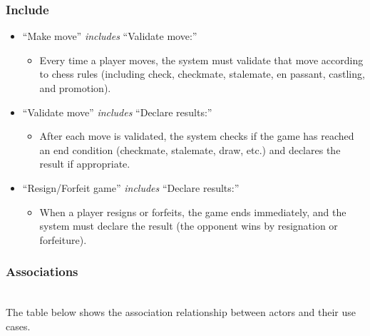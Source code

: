 \subsubsection{Include}\label{PovbgtA6PdVTusl-WohNN}

\begin{itemize}
\item
\protect{}\label{v1bv2yaZOXJcLVkdRRaDL}
``Make move'' \emph{includes} ``Validate move:''

\begin{itemize}
\item
Every time a player moves, the system must validate that move according to chess rules (including check, checkmate, stalemate, en passant, castling, and promotion).
\end{itemize}
\item
\protect{}\label{xQ3Ez3o9yNMGh8EaZkO7R}
``Validate move'' \emph{includes} ``Declare results:''

\begin{itemize}
\item
After each move is validated, the system checks if the game has reached an end condition (checkmate, stalemate, draw, etc.) and declares the result if appropriate.
\end{itemize}
\item
\protect{}\label{p_E_DDjViQfvyZnQjb6Yl}
``Resign/Forfeit game'' \emph{includes} ``Declare results:''

\begin{itemize}
\item
When a player resigns or forfeits, the game ends immediately, and the system must declare the result (the opponent wins by resignation or forfeiture).
\end{itemize}
\end{itemize}

\subsubsection{Associations}\label{v5BqGxLZjFDc8UwJNfc_R}
\\
The table below shows the association relationship between actors and their use cases.

